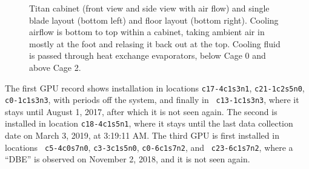 \begin{figure}
\begin{minipage}{0.49\columnwidth}
  \end{minipage}
  \caption{Titan cabinet (front view and side view with air flow) and
    single blade layout (bottom left) and floor layout (bottom
    right). Cooling airflow is bottom to top within a cabinet, taking
    ambient air in mostly at the foot and relasing it back out at the
    top. Cooling fluid is passed through heat exchange
    evaporators, below Cage 0 and above Cage 2.}
  \label{fig:layout}
\end{figure}


The first GPU record
shows installation in locations {\tt c17-4c1s3n1}, {\tt c21-1c2s5n0},
{\tt c0-1c1s3n3}, with periods off the system, and finally in {\tt
  c13-1c1s3n3}, where it stays until August 1, 2017, after which it is
not seen again. The second is installed in location {\tt c18-4c1s5n1},
where it stays until the last data collection date on March 3, 2019,
at 3:19:11 AM. The third GPU is first installed in locations {\tt
  c5-4c0s7n0}, {\tt c3-3c1s5n0}, {\tt c0-6c1s7n2}, and {\tt
  c23-6c1s7n2}, where a ``DBE'' is observed on November 2, 2018, and
it is not seen again.



